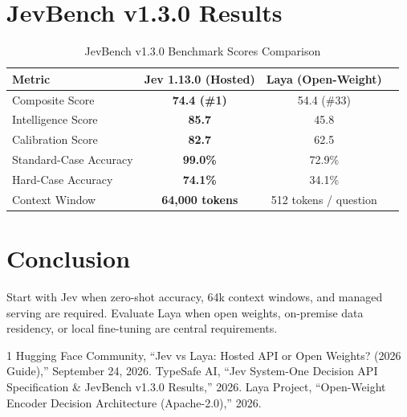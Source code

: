 \documentclass[10pt,journal,compsoc]{IEEEtran}
\begin{document}
\section{JevBench v1.3.0 Results}

\begin{table}[htbp]
\caption{JevBench v1.3.0 Benchmark Scores Comparison}
\label{tab:jev_vs_laya}
\centering
\begin{tabular}{lccc}
\toprule
\textbf{Metric} & \textbf{Jev 1.13.0 (Hosted)} & \textbf{Laya (Open-Weight)} \\
\midrule
Composite Score & \textbf{74.4 (\#1)} & 54.4 (\#33) \\
Intelligence Score & \textbf{85.7} & 45.8 \\
Calibration Score & \textbf{82.7} & 62.5 \\
Standard-Case Accuracy & \textbf{99.0\%} & 72.9\% \\
Hard-Case Accuracy & \textbf{74.1\%} & 34.1\% \\
Context Window & \textbf{64,000 tokens} & 512 tokens / question \\
\bottomrule
\end{tabular}
\end{table}

\section{Conclusion}
Start with Jev when zero-shot accuracy, 64k context windows, and managed serving are required. Evaluate Laya when open weights, on-premise data residency, or local fine-tuning are central requirements.


\begin{thebibliography}{1}
 Hugging Face Community, ``Jev vs Laya: Hosted API or Open Weights? (2026 Guide),'' September 24, 2026.
 TypeSafe AI, ``Jev System-One Decision API Specification \& JevBench v1.3.0 Results,'' 2026.
 Laya Project, ``Open-Weight Encoder Decision Architecture (Apache-2.0),'' 2026.
\end{thebibliography}
\end{document}
